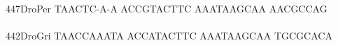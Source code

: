 \documentclass[11pt,twoside,reqno,a4paper]{article}
\begin{document}
{\hspace*{4\charwidth}\hspace*{7\charwidth}\hspace*{1\charwidth}\hspace*{1\charwidth}\hspace*{1\charwidth}\\
447\hspace*{1\charwidth}DroPer	TAACTC-A-A	ACCGTACTTC	AAATAAGCAA	AACGCCAG\\
\hspace*{4\charwidth}\hspace*{7\charwidth}\hspace*{1\charwidth}\hspace*{1\charwidth}\hspace*{1\charwidth}\\
442\hspace*{1\charwidth}DroGri	TAACCAAATA	ACCATACTTC	AAATAAGCAA	TGCGCACA\\
\hspace*{4\charwidth}\hspace*{7\charwidth}\hspace*{1\charwidth}\hspace*{1\charwidth}\hspace*{1\charwidth}\\
\\
}
\end{document}

